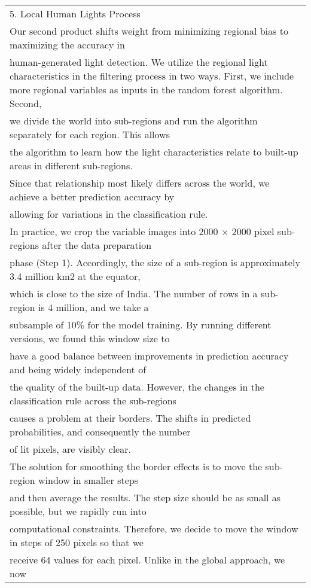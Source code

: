 \documentclass[11pt,preprint, authoryear]{elsarticle}
\numberwithin{equation}{section}
\numberwithin{figure}{section}
\numberwithin{table}{section}
\begin{document}
\begin{longtable}[]{@{}l@{}}
\toprule
\endhead
5. Local Human Lights Process \\
Our second product shifts weight from minimizing regional bias to
maximizing the accuracy in \\
human-generated light detection. We utilize the regional light
characteristics in the filtering process in two ways. First, we include
more regional variables as inputs in the random forest algorithm.
Second, \\
we divide the world into sub-regions and run the algorithm separately
for each region. This allows \\
the algorithm to learn how the light characteristics relate to built-up
areas in different sub-regions. \\
Since that relationship most likely differs across the world, we achieve
a better prediction accuracy by \\
allowing for variations in the classification rule. \\
In practice, we crop the variable images into 2000 × 2000 pixel
sub-regions after the data preparation \\
phase (Step 1). Accordingly, the size of a sub-region is approximately
3.4 million km2 at the equator, \\
which is close to the size of India. The number of rows in a sub-region
is 4 million, and we take a \\
subsample of 10\% for the model training. By running different versions,
we found this window size to \\
have a good balance between improvements in prediction accuracy and
being widely independent of \\
the quality of the built-up data. However, the changes in the
classification rule across the sub-regions \\
causes a problem at their borders. The shifts in predicted
probabilities, and consequently the number \\
of lit pixels, are visibly clear. \\
The solution for smoothing the border effects is to move the sub-region
window in smaller steps \\
and then average the results. The step size should be as small as
possible, but we rapidly run into \\
computational constraints. Therefore, we decide to move the window in
steps of 250 pixels so that we \\
receive 64 values for each pixel. Unlike in the global approach, we now

\end{longtable}
\end{document}

